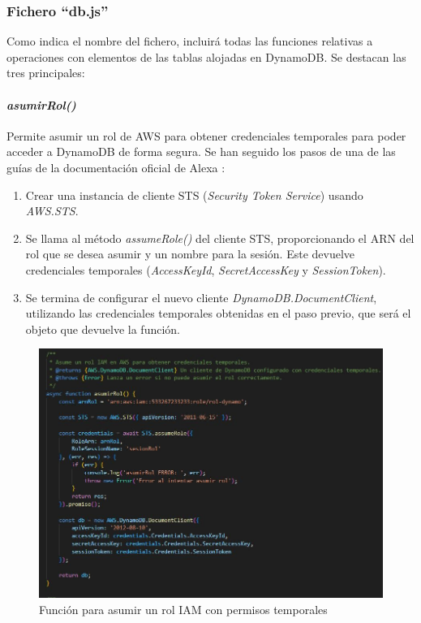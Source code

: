 \subsubsection{Fichero \enquote{db.js}}

Como indica el nombre del fichero, incluirá todas las funciones relativas a operaciones con elementos de las tablas alojadas en DynamoDB. Se destacan las tres principales:

\paragraph{\textit{asumirRol()}}

Permite asumir un rol de AWS para obtener credenciales temporales para poder acceder a DynamoDB de forma segura. Se han seguido los pasos de una de las guías de la documentación oficial de Alexa \parencite{alexaHosted2}:

\begin{enumerate}
	\item Crear una instancia de cliente STS (\textit{Security Token Service}) usando \textit{AWS.STS}.
	\item Se llama al método \textit{assumeRole()} del cliente STS, proporcionando el ARN del rol que se desea asumir y un nombre para la sesión. Este devuelve credenciales temporales (\textit{AccessKeyId}, \textit{SecretAccessKey} y \textit{SessionToken}).
	\item Se termina de configurar el nuevo cliente \textit{DynamoDB.DocumentClient}, utilizando las credenciales temporales obtenidas en el paso previo, que será el objeto que devuelve la función.
\end{enumerate}

\begin{figure}[H]
	\centering
	\includegraphics{imgs/codigo-db-1.jpg}
	\caption{Función para asumir un rol IAM con permisos temporales}
	\label{fig:codigo-db-1}
\end{figure}

